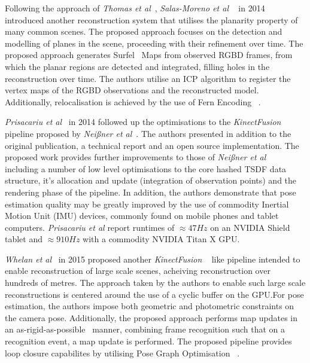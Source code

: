 Following the approach of \textit{Thomas et al}~\cite{Thomas2013}, \textit{Salas-Moreno et al} 
~\cite{Salas-Moreno2014} in 2014 introduced another reconstruction system that utilises the
planarity property of many common scenes. The proposed approach focuses on the detection and 
modelling of planes in the scene, proceeding with their refinement over time. 
The proposed approach generates Surfel~\cite{Pfister2000} Maps from observed RGBD frames, from 
which the planar regions are detected and integrated, filling holes in the reconstruction over time.
The authors utilise an ICP algorithm to register the vertex maps of the RGBD observations and the 
reconstructed model. Additionally, relocalisation is achieved by the use of Fern Encoding 
~\cite{Glocker2014}. 

\textit{Prisacariu et al}~\cite{Prisacariu2014, Kahler2015} in 2014 followed up the optimisations 
to the \textit{KinectFusion} pipeline proposed by \textit{Nei{\ss}ner et al}~\cite{NieBner2013}. 
The authors presented in addition to the original publication, a technical report and an open 
source implementation. The proposed work provides further improvements to those of 
\textit{Nei{\ss}ner et al}~\cite{NieBner2013} including a number of low level optimisations to the 
core hashed TSDF data structure, it's allocation and update (integration of observation points) and 
the rendering phase of the pipeline. In addition, the authors demonstrate that pose estimation quality 
may be greatly improved by the use of commodity Inertial Motion Unit (IMU) devices, commonly found 
on mobile phones and tablet computers. \textit{Prisacariu et al} report runtimes of 
\(\approx47Hz\) on an NVIDIA Shield tablet and \(\approx910Hz\) with a commodity NVIDIA Titan X GPU.\@

\textit{Whelan et al}~\cite{Whelan2015} in 2015 proposed another \textit{KinectFusion} 
~\cite{Newcombe2011} like pipeline intended to enable reconstruction of large scale scenes, 
acheiving reconstruction over hundreds of metres. The approach taken by the authors to enable 
such large scale reconstructions is centered around the use of a cyclic buffer on the GPU.\@ For pose 
estimation, the authors impose both geometric and photometric constraints on the camera pose. 
Additionally, the proposed approach performs map updates in an as-rigid-as-possible~\cite{Igarashi2005} 
manner, combining frame recognition such that on a recognition event, a map update is performed.
The proposed pipeline provides loop closure capabilites by utilising Pose Graph Optimisation 
~\cite{Grisetti2010}.

